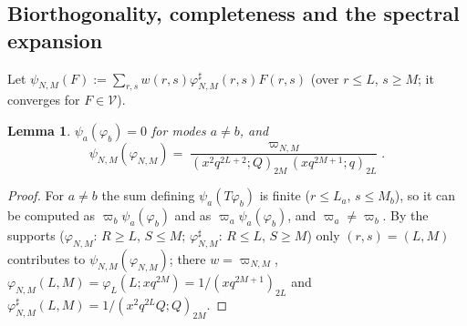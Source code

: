 \documentclass[11pt]{amsart}
\newtheorem{lemma}[theorem]{Lemma}
\theoremstyle{definition}
\numberwithin{equation}{section}
\begin{document}
\subsection{Biorthogonality, completeness and the spectral expansion}\label{ssec:spec}
Let $\psi_{N,M}(F):=\sum_{r,s}w(r,s)\varphi^\sharp_{N,M}(r,s)F(r,s)$ (over $r\le L$, $s\ge M$; it converges for $F\in\mathcal V$).

\begin{lemma}\label{lem:biorth}
$\psi_a(\varphi_b)=0$ for modes $a\ne b$, and
\[\psi_{N,M}(\varphi_{N,M})=\frac{\varpi_{N,M}}{(x^2q^{2L+2};Q)_{2M}\,(xq^{2M+1};q)_{2L}}.\]
\end{lemma}
\begin{proof}
For $a\ne b$ the sum defining $\psi_a(T\varphi_b)$ is finite ($r\le L_a$, $s\le M_b$), so it can be computed as
$\varpi_b\psi_a(\varphi_b)$ and as $\varpi_a\psi_a(\varphi_b)$, and $\varpi_a\ne\varpi_b$. By the supports
($\varphi_{N,M}$: $R\ge L$, $S\le M$; $\varphi^\sharp_{N,M}$: $R\le L$, $S\ge M$) only $(r,s)=(L,M)$ contributes to
$\psi_{N,M}(\varphi_{N,M})$; there $w=\varpi_{N,M}$, $\varphi_{N,M}(L,M)=\varphi_L(L;xq^{2M})=1/(xq^{2M+1})_{2L}$ and
$\varphi^\sharp_{N,M}(L,M)=1/(x^2q^{2L}Q;Q)_{2M}$.
\end{proof}
\end{document}
